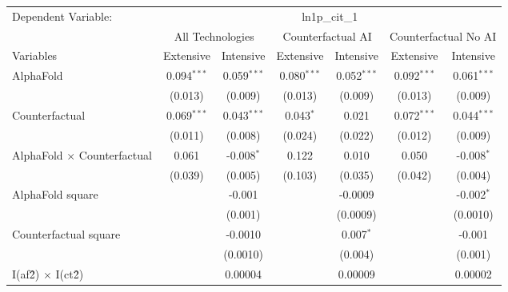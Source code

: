 \begingroup
\centering
\begin{tabular}{lcccccc}
   \tabularnewline \midrule \midrule
   Dependent Variable: & \multicolumn{6}{c}{ln1p\_cit\_1}\\
 & \multicolumn{2}{c}{All Technologies} & \multicolumn{2}{c}{Counterfactual AI} & \multicolumn{2}{c}{Counterfactual No AI} \\
\cmidrule(lr){1-1}\cmidrule(lr){2-3} \cmidrule(lr){4-5} \cmidrule(lr){6-7}
Variables & \multicolumn{1}{c}{Extensive} & \multicolumn{1}{c}{Intensive} & \multicolumn{1}{c}{Extensive} & \multicolumn{1}{c}{Intensive} & \multicolumn{1}{c}{Extensive} & \multicolumn{1}{c}{Intensive} \\
\cmidrule(lr){1-1}\cmidrule(lr){2-2} \cmidrule(lr){3-3} \cmidrule(lr){4-4} \cmidrule(lr){5-5} \cmidrule(lr){6-6} \cmidrule(lr){7-7}
   AlphaFold                          & 0.094$^{***}$ & 0.059$^{***}$ & 0.080$^{***}$ & 0.052$^{***}$ & 0.092$^{***}$ & 0.061$^{***}$\\   
                                      & (0.013)       & (0.009)       & (0.013)       & (0.009)       & (0.013)       & (0.009)\\   
   Counterfactual                     & 0.069$^{***}$ & 0.043$^{***}$ & 0.043$^{*}$   & 0.021         & 0.072$^{***}$ & 0.044$^{***}$\\   
                                      & (0.011)       & (0.008)       & (0.024)       & (0.022)       & (0.012)       & (0.009)\\   
   AlphaFold $\times$ Counterfactual  & 0.061         & -0.008$^{*}$  & 0.122         & 0.010         & 0.050         & -0.008$^{*}$\\   
                                      & (0.039)       & (0.005)       & (0.103)       & (0.035)       & (0.042)       & (0.004)\\   
   AlphaFold square                   &               & -0.001        &               & -0.0009       &               & -0.002$^{*}$\\   
                                      &               & (0.001)       &               & (0.0009)      &               & (0.0010)\\   
   Counterfactual square              &               & -0.0010       &               & 0.007$^{*}$   &               & -0.001\\   
                                      &               & (0.0010)      &               & (0.004)       &               & (0.001)\\   
   I(af\^2) $\times$ I(ct\^2)         &               & 0.00004       &               & 0.00009       &               & 0.00002\\   

\end{tabular}
